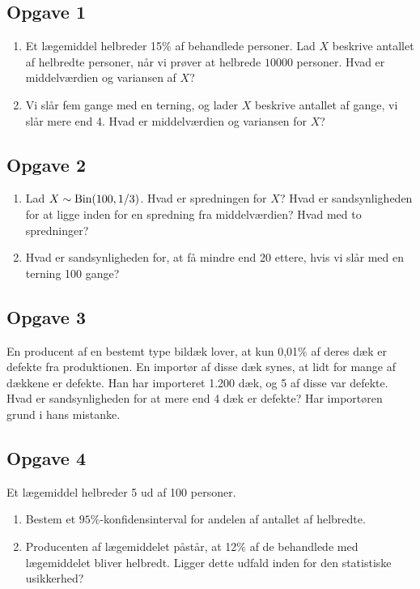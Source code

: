 \subsection*{Opgave 1}
\begin{enumerate}[label=\roman*)]
\item Et lægemiddel helbreder 15$\%$ af behandlede personer. Lad $X$ beskrive antallet af helbredte personer, når vi prøver at helbrede $10000$ personer. Hvad er middelværdien og variansen af $X$?
\item Vi slår fem gange med en terning, og lader $X$ beskrive antallet af gange, vi slår mere end 4. Hvad er middelværdien og variansen for $X$?

\end{enumerate}


\subsection*{Opgave 2}
\begin{enumerate}[label=\roman*)]
\item Lad $X\sim \textnormal{Bin}(100,1/3)$. Hvad er spredningen for $X$? Hvad er sandsynligheden for at ligge inden for en spredning fra middelværdien? Hvad med to spredninger? 
\item Hvad er sandsynligheden for, at få mindre end 20 ettere, hvis vi slår med en terning 100 gange?
\end{enumerate}
\subsection*{Opgave 3}
En producent af en bestemt type bildæk lover, at kun 0,01$\%$ af deres dæk er defekte fra produktionen. En importør af disse dæk synes, at lidt for mange af dækkene er defekte. Han har importeret 1.200 dæk, og 5 af disse var defekte. Hvad er sandsynligheden for at mere end 4 dæk er defekte? Har importøren grund i hans mistanke.


\subsection*{Opgave 4}
Et lægemiddel helbreder 5 ud af 100 personer. 
\begin{enumerate}[label=\roman*)]
	\item Bestem et $95\%$-konfidensinterval for andelen af antallet af helbredte.
	\item Producenten af lægemiddelet påstår, at 12$\%$ af de behandlede med lægemiddelet bliver helbredt. Ligger dette udfald inden for den statistiske usikkerhed?
\end{enumerate}

